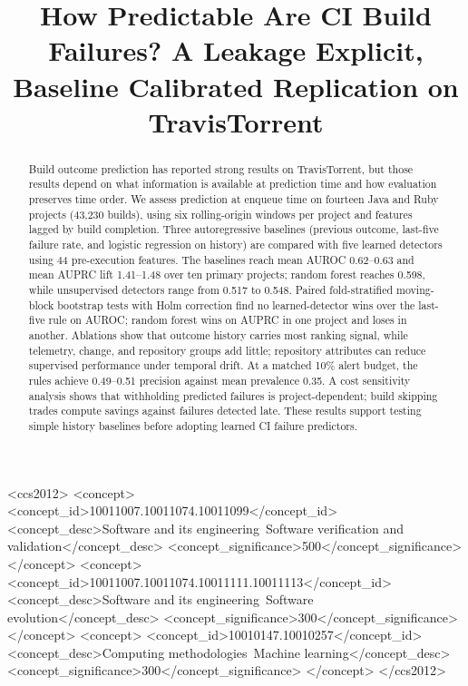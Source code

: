 \documentclass[sigconf,review,anonymous,nonacm]{acmart}
\begin{document}
\title[How Predictable Are CI Build Failures?]{How Predictable Are CI Build Failures? A Leakage Explicit, Baseline Calibrated Replication on TravisTorrent}

\begin{abstract}
Build outcome prediction has reported strong results on TravisTorrent, but those results depend on what information is available at prediction time and how evaluation preserves time order. We assess prediction at enqueue time on fourteen Java and Ruby projects (43{,}230 builds), using six rolling-origin windows per project and features lagged by build completion. Three autoregressive baselines (previous outcome, last-five failure rate, and logistic regression on history) are compared with five learned detectors using 44 pre-execution features. The baselines reach mean AUROC 0.62--0.63 and mean AUPRC lift 1.41--1.48 over ten primary projects; random forest reaches 0.598, while unsupervised detectors range from 0.517 to 0.548. Paired fold-stratified moving-block bootstrap tests with Holm correction find no learned-detector wins over the last-five rule on AUROC; random forest wins on AUPRC in one project and loses in another. Ablations show that outcome history carries most ranking signal, while telemetry, change, and repository groups add little; repository attributes can reduce supervised performance under temporal drift. At a matched 10\% alert budget, the rules achieve 0.49--0.51 precision against mean prevalence 0.35. A cost sensitivity analysis shows that withholding predicted failures is project-dependent; build skipping trades compute savings against failures detected late. These results support testing simple history baselines before adopting learned CI failure predictors.
\end{abstract}

\begin{CCSXML}
<ccs2012>
<concept>
<concept_id>10011007.10011074.10011099</concept_id>
<concept_desc>Software and its engineering~Software verification and validation</concept_desc>
<concept_significance>500</concept_significance>
</concept>
<concept>
<concept_id>10011007.10011074.10011111.10011113</concept_id>
<concept_desc>Software and its engineering~Software evolution</concept_desc>
<concept_significance>300</concept_significance>
</concept>
<concept>
<concept_id>10010147.10010257</concept_id>
<concept_desc>Computing methodologies~Machine learning</concept_desc>
<concept_significance>300</concept_significance>
</concept>
</ccs2012>
\end{CCSXML}
\end{document}
